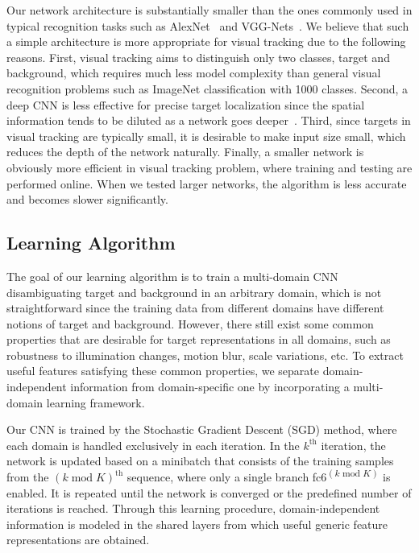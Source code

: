 \documentclass[10pt,twocolumn,letterpaper]{article}
\begin{document}
Our network architecture is substantially smaller than the ones commonly used in typical recognition tasks such as AlexNet~\cite{krizhevsky2012imagenet} and VGG-Nets~\cite{chatfield2014return,SimonyanICLR15}.
We believe that such a simple architecture is more appropriate for visual tracking due to the following reasons. 
First, visual tracking aims to distinguish only two classes, target and background, which requires much less model complexity than general visual recognition problems such as ImageNet classification with 1000 classes.
Second, a deep CNN is less effective for precise target localization since the spatial information tends to be diluted as a network goes deeper~\cite{hong2015online}.
Third, since targets in visual tracking are typically small, it is desirable to make input size small, which reduces the depth of the network naturally.
Finally, a smaller network is obviously more efficient in visual tracking problem, where training and testing are performed online.
When we tested larger networks, the algorithm is less accurate and becomes slower significantly.


\subsection{Learning Algorithm}
\label{sec:mdl}
The goal of our learning algorithm is to train a multi-domain CNN disambiguating target and background in an arbitrary domain, which is not straightforward since the training data from different domains have different notions of target and background.
However, there still exist some common properties that are desirable for target representations in all domains, such as robustness to illumination changes, motion blur, scale variations, etc.
To extract useful features satisfying these common properties, we separate domain-independent  information from domain-specific one by incorporating a multi-domain learning framework.

Our CNN is trained by the Stochastic Gradient Descent (SGD) method, where each domain is handled exclusively in each iteration. 
In the $k^{\text{th}}$ iteration, the network is updated based on a minibatch that consists of the training samples from the $(k \operatorname{mod} K)^{\text{th}}$ sequence, where only a single branch fc6\textsuperscript{$(k \operatorname{mod} K)$} is enabled. 
It is repeated until the network is converged or the predefined number of iterations is reached.
Through this learning procedure, domain-independent information is modeled in the shared layers from which useful generic feature representations are obtained.
\end{document}

